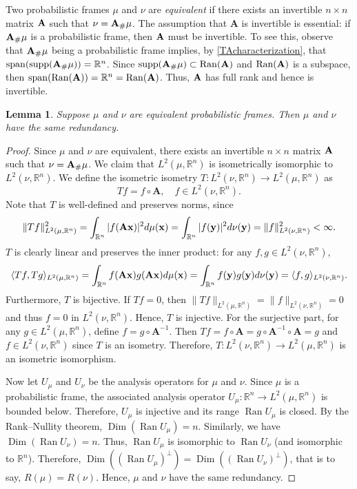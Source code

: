 \documentclass{amsart}
\numberwithin{equation}{section}
\DeclareMathOperator{\supp}{supp}
\DeclareMathOperator{\spa}{span}
\DeclareMathOperator{\range}{Ran}
\DeclareMathOperator{\Dim}{Dim}
\theoremstyle{plain}
\newtheorem{lemma}[theorem]{Lemma}
\theoremstyle{remark}
\theoremstyle{definition}
\begin{document}
Two probabilistic frames $\mu$ and $\nu$ are \emph{equivalent} if there exists an invertible $n \times n$ matrix ${\bf A}$ such that $\nu = {\bf A}_\#\mu$. The assumption that $\mathbf{A}$ is invertible is essential: if ${\bf A}_\#\mu$ is a probabilistic frame, then ${\bf A}$ must be invertible. To see this, observe that ${\bf A}_\#\mu$ being a probabilistic frame implies, by \cref{TAcharacterization}, that $\spa(\supp({\bf A}_\#\mu)) = \mathbb{R}^n$. Since $\supp({\bf A}_\#\mu) \subset \range({\bf A})$ and $\range({\bf A})$ is a subspace, then $\spa(\range({\bf A})) = \mathbb{R}^n = \range({\bf A})$. Thus, ${\bf A}$ has full rank and hence is invertible. 


\begin{lemma}\label{lem:equivalent implies same redundancy}
Suppose $\mu$ and $\nu$ are equivalent probabilistic frames. Then $\mu$ and $\nu$ have the same redundancy. 
\end{lemma}
\begin{proof}
Since $\mu$ and $\nu$ are equivalent, there exists an invertible $n \times n$ matrix ${\bf A}$ such that $\nu = {\bf A}_\#\mu$. We claim that $L^2(\mu, \mathbb{R}^n)$ is isometrically isomorphic to $L^2(\nu, \mathbb{R}^n)$. We define the isometric isometry  $T: L^2(\nu, \mathbb{R}^n) \rightarrow L^2(\mu, \mathbb{R}^n)$ as
\[
Tf = f \circ \mathbf{A}, \quad f \in L^2(\nu, \mathbb{R}^n). 
\]
Note that $T$ is well-defined and preserves norms, since 
\[
\|Tf\|_{L^2(\mu, \mathbb{R}^n)}^2 = \int_{\mathbb{R}^n} |f(\mathbf{A}{\bf x})|^2  d\mu({\bf x}) =  \int_{\mathbb{R}^n} |f({\bf y})|^2 d\nu({\bf y}) = \|f\|_{L^2(\nu, \mathbb{R}^n)}^2 < \infty.
\]
$T$ is clearly linear and preserves the inner product: for any $f, g \in L^2(\nu, \mathbb{R}^n)$,
\[
\langle Tf, Tg \rangle_{L^2(\mu, \mathbb{R}^n)} = \int_{\mathbb{R}^n} f(\mathbf{Ax}) g(\mathbf{Ax})  d\mu({\bf x}) = \int_{\mathbb{R}^n} f({\bf y}) g({\bf y}) d\nu({\bf y}) = \langle f, g \rangle_{L^2(\nu, {\mathbb{R}^n})}.
\]
Furthermore, $T$ is bijective. If $Tf = 0$, then $\|Tf\|_{L^2(\mu, \mathbb{R}^n)} = \|f\|_{L^2(\nu, \mathbb{R}^n)} = 0$ and thus $f = 0$ in $L^2(\nu, \mathbb{R}^n)$. Hence, $T$ is injective. For the surjective part, for any $g \in L^2(\mu, \mathbb{R}^n)$, define $f = g \circ \mathbf{A}^{-1}$. Then $Tf = f \circ \mathbf{A} = g \circ \mathbf{A}^{-1} \circ \mathbf{A} = g
$ and $f \in L^2(\nu, \mathbb{R}^n)$ since $T$ is an isometry. Therefore, $T: L^2(\nu, \mathbb{R}^n) \rightarrow L^2(\mu, \mathbb{R}^n)$ is an isometric isomorphism.



Now let $U_\mu$ and $U_{\nu}$ be the analysis operators for $\mu$ and $\nu$. Since $\mu$ is a probabilistic frame, the associated analysis operator $U_\mu: \mathbb{R}^n \rightarrow L^2(\mu, \mathbb{R}^n)$ is bounded below. Therefore, $U_\mu$ is injective and its range $\range U_\mu$ is closed. By the Rank–Nullity theorem, $\Dim(\range U_\mu) = n$. Similarly, we have $\Dim(\range U_\nu) = n$. Thus, $\range U_\mu$ is isomorphic to $\range U_\nu$ (and isomorphic to $\mathbb{R}^n$). Therefore, $\Dim((\range U_\mu)^\perp) = \Dim((\range U_\nu)^\perp)$, that is to say, $R(\mu) = R(\nu)$. Hence, $\mu$ and $\nu$ have the same redundancy.
\end{proof}
\end{document}

